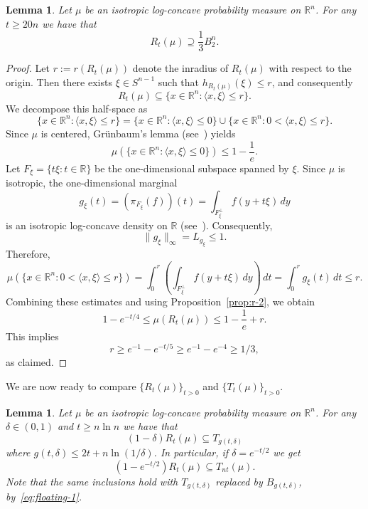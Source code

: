\documentclass[11pt,leqno]{article}
\newtheorem{lemma}[theorem]{Lemma}
\theoremstyle{definition}
\theoremstyle{remark}
\numberwithin{equation}{section}
\newcommand{\ls}{\leqslant}
\newcommand{\gr}{\geqslant}
\newcommand{\1}{\textbf{1}}
\begin{document}
\begin{lemma}\label{lem:gamma-ball}Let $\mu$ be an isotropic log-concave probability measure on ${\mathbb R}^n$.
For any $t\gr 20n$ we have that
$$R_t(\mu)\supseteq  \frac{1}{3}B_2^n.$$
\end{lemma}

\begin{proof}Let $r:=r(R_t(\mu))$ denote the inradius of $R_t(\mu)$ with respect to the origin. Then there exists $\xi\in S^{n-1}$ such that
$h_{R_t(\mu)}(\xi)\ls r$, and consequently
$$R_t(\mu)\subseteq \{x\in\mathbb{R}^n:\langle x,\xi\rangle \ls r\}.$$
We decompose this half-space as
$$\{x\in\mathbb{R}^n:\langle x,\xi\rangle \ls r\}=\{x\in\mathbb{R}^n:\langle x,\xi\rangle \ls 0\}\cup \{x\in\mathbb{R}^n:0<\langle x,\xi\rangle \ls r\}.$$
Since $\mu$ is centered, Gr\"{u}nbaum's lemma (see~\cite[Lemma~2.2.6]{BGVV-book}) yields 
$$\mu(\{x\in\mathbb{R}^n:\langle x,\xi\rangle\ls 0\})\ls 1-\frac{1}{e}.$$
Let $F_{\xi}=\{t\xi:t\in\mathbb{R}\}$ be the one-dimensional subspace spanned by $\xi$.
Since $\mu$ is isotropic, the one-dimensional marginal $$g_{\xi}(t)=(\pi_{F_{\xi}}(f))(t)=\int_{F_{\xi}^{\perp}}f(y+t\xi )\,dy$$
is an isotropic log-concave density on $\mathbb{R}$ (see~\cite[Proposition~5.1.11]{BGVV-book}). Consequently,
\begin{equation*}\|g_{\xi}\|_{\infty}=L_{g_{\xi}}\ls 1.\end{equation*}
Therefore,
$$\mu(\{x\in\mathbb{R}^n:0<\langle x,\xi\rangle\ls r\})=\int_0^r\left(\int_{F_{\xi}^{\perp}}f(y+t\xi)\,dy\right)\,dt=\int_0^rg_{\xi}(t)\,dt\ls r.$$
Combining these estimates and using Proposition~\ref{prop:r-2}, we obtain
$$1-e^{-t/4}\ls \mu(R_t(\mu))\ls 1-\frac{1}{e}+r.$$
This implies 
$$r\gr e^{-1}-e^{-t/5}\gr e^{-1}-e^{-4}\gr 1/3,$$
as claimed.\end{proof}

We are now ready to compare $\{R_t(\mu)\}_{t>0}$ and $\{T_t(\mu)\}_{t>0}$.

\begin{lemma}\label{lem:level-B}Let $\mu$ be an isotropic log-concave probability measure on ${\mathbb R}^n$. For
any $\delta\in (0,1)$ and $t\gr n\ln n$ we have that
$$(1-\delta)R_t(\mu)\subseteq T_{g(t,\delta)}$$
where $g(t,\delta)\ls 2t+n\ln(1/\delta)$. In particular, if $\delta =e^{-t/2}$ we get
$$(1-e^{-t/2})R_t(\mu)\subseteq T_{nt}(\mu).$$
Note that the same inclusions hold with $T_{g(t,\delta)}$ replaced by $B_{g(t,\delta)}$, by~\eqref{eq:floating-1}.
\end{lemma}
\end{document}
